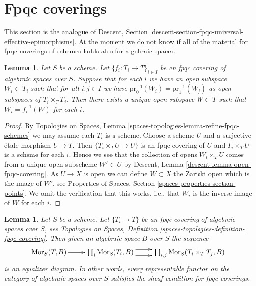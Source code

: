 \documentclass{stacks-project}
\theoremstyle{plain}
\newtheorem{lemma}[subsection]{Lemma}
\theoremstyle{definition}
\theoremstyle{remark}
\numberwithin{equation}{subsection}
\def\Mor{\mathop{\mathrm{Mor}}\nolimits}
\begin{document}
\section{Fpqc coverings}
\label{section-fpqc}

\noindent
This section is the analogue of
Descent, Section \ref{descent-section-fpqc-universal-effective-epimorphisms}.
At the moment we do not know if all of the material for
fpqc coverings of schemes holds also for algebraic spaces.

\begin{lemma}
\label{lemma-open-fpqc-covering}
Let $S$ be a scheme.
Let $\{f_i : T_i \to T\}_{i \in I}$ be an fpqc covering
of algebraic spaces over $S$.
Suppose that for each $i$ we have an open subspace $W_i \subset T_i$
such that for all $i, j \in I$ we have
$\text{pr}_0^{-1}(W_i) = \text{pr}_1^{-1}(W_j)$ as open
subspaces of $T_i \times_T T_j$. Then there exists a unique open subspace
$W \subset T$ such that $W_i = f_i^{-1}(W)$ for each $i$.
\end{lemma}

\begin{proof}
By
Topologies on Spaces, Lemma \ref{spaces-topologies-lemma-refine-fpqc-schemes}
we may assume each $T_i$ is a scheme.
Choose a scheme $U$ and a surjective \'etale morphism $U \to T$.
Then $\{T_i \times_T U \to U\}$ is an fpqc covering of $U$
and $T_i \times_T U$ is a scheme for each $i$. Hence we
see that the collection of opens $W_i \times_T U$ comes from a unique
open subscheme $W' \subset U$ by
Descent, Lemma \ref{descent-lemma-open-fpqc-covering}.
As $U \to X$ is open we can define $W \subset X$ the Zariski
open which is the image of $W'$, see
Properties of Spaces, Section \ref{spaces-properties-section-points}.
We omit the verification that this works, i.e., that
$W_i$ is the inverse image of $W$ for each $i$.
\end{proof}

\begin{lemma}
\label{lemma-fpqc-universal-effective-epimorphisms}
Let $S$ be a scheme. Let $\{T_i \to T\}$ be an fpqc covering of algebraic
spaces over $S$, see Topologies on Spaces, Definition
\ref{spaces-topologies-definition-fpqc-covering}.
Then given an algebraic space $B$ over $S$ the sequence
$$
\xymatrix{
\Mor_S(T, B) \ar[r] &
\prod\nolimits_i \Mor_S(T_i, B) \ar@<1ex>[r] \ar@<-1ex>[r] &
\prod\nolimits_{i, j} \Mor_S(T_i \times_T T_j, B)
}
$$
is an equalizer diagram.
In other words, every representable functor on the category of
algebraic spaces over $S$ satisfies the sheaf condition for
fpqc coverings.
\end{lemma}
\end{document}
